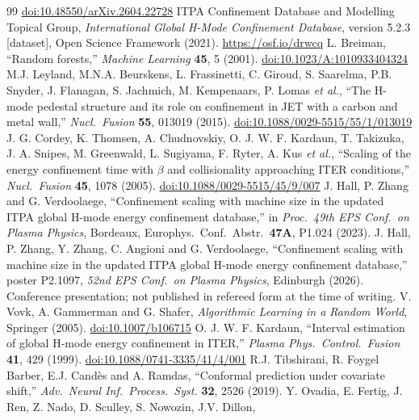 \documentclass[aip,pop,preprint,amsmath,amssymb]{revtex4-2}
\begin{document}
\begin{thebibliography}{99}
\href{https://doi.org/10.48550/arXiv.2604.22728}{doi:10.48550/arXiv.2604.22728}
 ITPA Confinement Database and Modelling Topical Group,
\emph{International Global H-Mode Confinement Database}, version 5.2.3
[dataset], Open Science Framework (2021). \url{https://osf.io/drwcq}
 L. Breiman, ``Random forests,'' \emph{Machine Learning}
\textbf{45}, 5 (2001).
\href{https://doi.org/10.1023/A:1010933404324}{doi:10.1023/A:1010933404324}
 M.J. Leyland, M.N.A. Beurskens, L. Frassinetti, C. Giroud, S. Saarelma,
P.B. Snyder, J. Flanagan, S. Jachmich, M. Kempenaars, P. Lomas \emph{et al.},
``The H-mode pedestal structure
and its role on confinement in JET with a carbon and metal wall,''
\emph{Nucl.\ Fusion} \textbf{55}, 013019 (2015).
\href{https://doi.org/10.1088/0029-5515/55/1/013019}{doi:10.1088/0029-5515/55/1/013019}
 J. G. Cordey, K. Thomsen, A. Chudnovskiy, O. J. W. F. Kardaun, T. Takizuka,
J. A. Snipes, M. Greenwald, L. Sugiyama, F. Ryter, A. Kus \emph{et al.},
``Scaling of the energy confinement
time with $\beta$ and collisionality approaching ITER conditions,'' \emph{Nucl.\
Fusion} \textbf{45}, 1078 (2005).
\href{https://doi.org/10.1088/0029-5515/45/9/007}{doi:10.1088/0029-5515/45/9/007}
\bibitem{hall} J. Hall, P. Zhang and G. Verdoolaege, ``Confinement scaling with
machine size in the updated ITPA global H-mode energy confinement database,'' in
\emph{Proc.\ 49th EPS Conf.\ on Plasma Physics}, Bordeaux, Europhys.\ Conf.\
Abstr.\ \textbf{47A}, P1.024 (2023).
\bibitem{hall26} J. Hall, P. Zhang, Y. Zhang, C. Angioni and G. Verdoolaege,
``Confinement scaling with machine size in the updated ITPA global H-mode
energy confinement database,'' poster P2.1097, \emph{52nd EPS Conf.\ on Plasma
Physics}, Edinburgh (2026). Conference presentation; not published in refereed
form at the time of writing.
\bibitem{conformal} V. Vovk, A. Gammerman and G. Shafer,
\emph{Algorithmic Learning in a Random World}, Springer (2005).
\href{https://doi.org/10.1007/b106715}{doi:10.1007/b106715}
\bibitem{kardaun} O. J. W. F. Kardaun, ``Interval estimation of global H-mode
energy confinement in ITER,'' \emph{Plasma Phys.\ Control.\ Fusion} \textbf{41},
429 (1999).
\href{https://doi.org/10.1088/0741-3335/41/4/001}{doi:10.1088/0741-3335/41/4/001}
 R.J. Tibshirani, R. Foygel Barber, E.J. Cand\`es and
A. Ramdas, ``Conformal prediction under covariate shift,'' \emph{Adv.\ Neural
Inf.\ Process.\ Syst.} \textbf{32}, 2526 (2019).
\bibitem{ovadia} Y. Ovadia, E. Fertig, J. Ren, Z. Nado, D. Sculley, S. Nowozin, J.V. Dillon,

\end{thebibliography}
\end{document}
